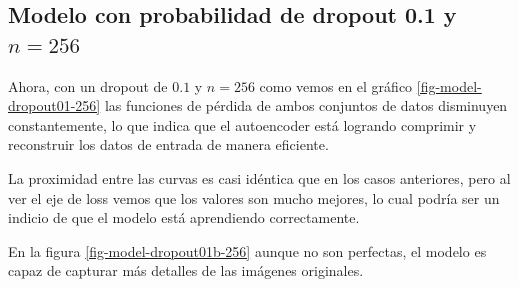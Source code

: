 \documentclass[aps,prl,reprint,groupedaddress]{revtex4-2}
\begin{document}
\subsection{Modelo con probabilidad de dropout 0.1 y $n=256$}

Ahora, con un dropout de $0.1$ y $n=256$ como vemos en el gráfico 
\ref{fig-model-dropout01-256} las funciones de pérdida de ambos conjuntos 
de datos disminuyen constantemente, lo que indica que el autoencoder está logrando 
comprimir y reconstruir los datos de entrada de manera eficiente. 

La proximidad entre las curvas es casi idéntica que en los casos anteriores, 
pero al ver el eje de loss vemos que los valores son mucho mejores, lo cual
podría ser un indicio de que el modelo está aprendiendo correctamente.

En la figura \ref{fig-model-dropout01b-256} aunque no son perfectas, el modelo es 
capaz de capturar más detalles de las imágenes originales.
\end{document}
